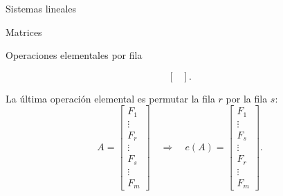 \begin{chapter}{Sistemas lineales}
\begin{section}{Matrices}
\begin{subsection}{Operaciones elementales por fila}
\begin{definicion}
\begin{enumelem}
$$\begin{bmatrix}
                        \end{bmatrix}.$$
                        \item La última operación elemental es  permutar la fila $r$ por la fila $s$:
                        $$
                        A= \begin{bmatrix} 
                        F_1 \\ 	\vdots \\ F_r \\ \vdots \\ F_s\\ \vdots \\	F_m
                        \end{bmatrix} \quad \Rightarrow \quad
                        e(A)= \begin{bmatrix} 
                        F_1 \\ 	\vdots \\ F_s \\ \vdots \\ F_r\\ \vdots \\	F_m
                        \end{bmatrix}.$$
                    \end{enumelem}
                \end{definicion} 


\end{subsection}
\end{section}
\end{chapter}

